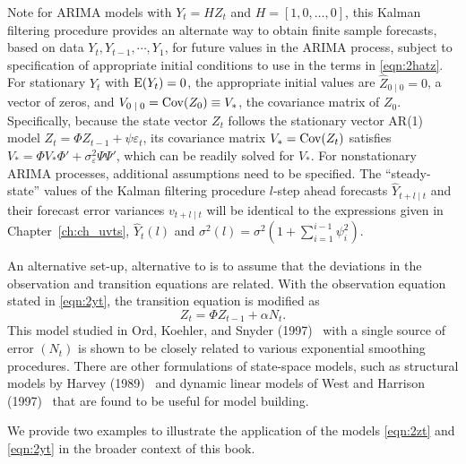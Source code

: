 Note for ARIMA models with $Y_t = HZ_t$ and $H = [1,0,\ldots,0]$, this Kalman filtering procedure provides an alternate way to obtain finite sample forecasts, based on data $Y_t,Y_{t-1}, \cdots, Y_1$, for future values in the ARIMA process, subject to specification of appropriate initial conditions to use in the terms in \eqref{eqn:2hatz}. For stationary $Y_t$ with $\operatorname{E}(Y_t)= 0$, the appropriate initial values are $\hat{Z}_{0 \;|\;0} = 0$, a vector of zeros, and $V_{0 \;|\;0} = \operatorname{Cov}(Z_0) \equiv V_*$, the covariance matrix of $Z_0$. Specifically, because the state vector $Z_t$ follows the stationary vector AR(1) model $Z_t = \Phi Z_{t-1} + \psi \varepsilon_t$, its covariance matrix $V_*= \operatorname{Cov}(Z_t)$ satisfies $V_*= \Phi V_* \Phi' + \sigma_{\varepsilon}^2 \Psi \Psi'$, which can be readily solved for $V_*$. For nonstationary ARIMA processes, additional assumptions need to be specified. The ``steady-state'' values of the Kalman filtering procedure $l$-step ahead forecasts $\hat{Y}_{t+l\;|\;t}$ and their forecast error variances $v_{t+l\;|\;t}$ will be identical to the expressions given in Chapter~\ref{ch:ch_uvts}, $\hat{Y}_t(l)$ and $\sigma^2(l) = \sigma^2 (1 + \sum_{i=1}^{i-1}\psi_{i}^2 )$. 


An alternative set-up, alternative to is to assume that the deviations in the observation and transition equations are related. With the observation equation stated in \eqref{eqn:2yt}, the transition equation is modified as 
	\begin{equation} \label{eqn:223zt}
	Z_t = \Phi Z_{t-1} + \alpha N_t.
	\end{equation}
This model studied in Ord, Koehler, and Snyder (1997)~\cite{ord1997estimation} with a single source of error $(N_t)$ is shown to be closely related to various exponential smoothing procedures. There are other formulations of state-space models, such as structural models by Harvey (1989)~\cite{harvey1989kalman} and dynamic linear models of West and Harrison (1997)~\cite{west1997} that are found to be useful for model building.


We provide two examples to illustrate the application of the models \eqref{eqn:2zt} and \eqref{eqn:2yt} in the broader context of this book. 


